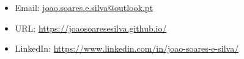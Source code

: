 \documentclass[10pt,a4paper,oneside]{article}
\newlength{\datewidth}
\newlength{\textindent}
\begin{document}
	
	
	\vspace{5mm}
	
	\begin{itemize}
		\item[\hspace{\datewidth}] \parbox[t]{\dimexpr\linewidth-\datewidth-\textindent}{Email: \href{mailto:joao.soares.e.silva@outlook.pt}{joao.soares.e.silva@outlook.pt}}
		\item[\hspace{\datewidth}] \parbox[t]{\dimexpr\linewidth-\datewidth-\textindent}{URL: \url{https://joaosoaresesilva.github.io/}}
		\item[\hspace{\datewidth}] \parbox[t]{\dimexpr\linewidth-\datewidth-\textindent}{LinkedIn: \url{https://www.linkedin.com/in/joao-soares-e-silva/}}
	\end{itemize}
	
\end{document}
